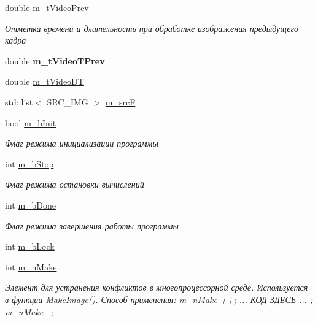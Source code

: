 \begin{DoxyCompactItemize}
\item 
double \hyperlink{class_c_v_i_engine_base_a45286d497ebc137775cda4999ff9fed6}{m\+\_\+t\+Video\+Prev}
\begin{DoxyCompactList}\small\item\em Отметка времени и длительность при обработке изображения предыдущего кадра \end{DoxyCompactList}\item 
\hypertarget{class_c_v_i_engine_base_ac29a85370558b6c5dce1ee2ba1517689}{double {\bfseries m\+\_\+t\+Video\+T\+Prev}}\label{class_c_v_i_engine_base_ac29a85370558b6c5dce1ee2ba1517689}

\item 
double \hyperlink{class_c_v_i_engine_base_a0bbf6f3d2d6b80fec8d223ffb44a6791}{m\+\_\+t\+Video\+D\+T}
\item 
std\+::list$<$ S\+R\+C\+\_\+\+I\+M\+G $>$ \hyperlink{class_c_v_i_engine_base_a67a15f389d32a0201997a71dc4695803}{m\+\_\+src\+F}
\item 
bool \hyperlink{class_c_v_i_engine_base_a775fea6c14d39ec6989306017f4f1c9e}{m\+\_\+b\+Init}
\begin{DoxyCompactList}\small\item\em Флаг режима инициализации программы \end{DoxyCompactList}\item 
int \hyperlink{class_c_v_i_engine_base_a13cd33209e328eed98e79086439748b2}{m\+\_\+b\+Stop}
\begin{DoxyCompactList}\small\item\em Флаг режима остановки вычислений \end{DoxyCompactList}\item 
int \hyperlink{class_c_v_i_engine_base_aa780c31b49f591af32d9a40e21978201}{m\+\_\+b\+Done}
\begin{DoxyCompactList}\small\item\em Флаг режима завершения работы программы \end{DoxyCompactList}\item 
int \hyperlink{class_c_v_i_engine_base_aa909c6b38f749c7b4d848f8b2de331bc}{m\+\_\+b\+Lock}
\item 
int \hyperlink{class_c_v_i_engine_base_a4f173a318d25c068952f2c68f4248208}{m\+\_\+n\+Make}
\begin{DoxyCompactList}\small\item\em Элемент для устранения конфликтов в многопроцессорной среде. Используется в функции \hyperlink{class_c_v_i_engine_base_a3426944a03bac2f5a8c135c217f9cf8c}{Make\+Image()}. Способ применения\+: m\+\_\+n\+Make ++; ... КОД ЗДЕСЬ ... ; m\+\_\+n\+Make --; \end{DoxyCompactList}\item 

\end{DoxyCompactItemize}
